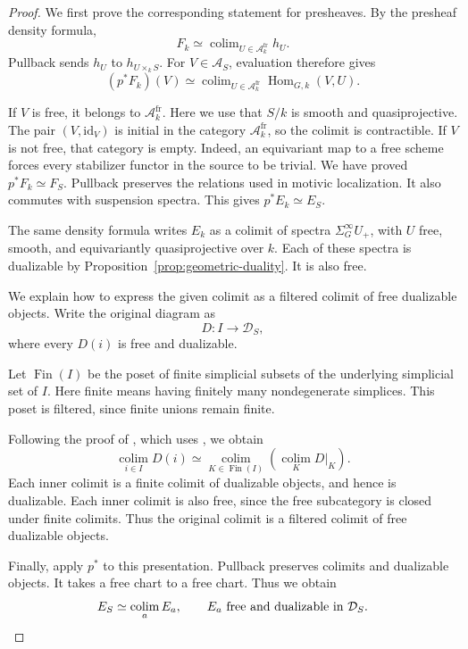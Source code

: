 \documentclass[11pt,reqno]{amsart}
\theoremstyle{definition}
\theoremstyle{remark}
\theoremstyle{plain}
\numberwithin{equation}{section}
\DeclareMathOperator*{\colim}{colim}
\begin{document}
\begin{proof}
We first prove the corresponding statement for presheaves.
By the presheaf density formula,
\[
 F_k\simeq
 \colim_{U\in\mathcal A_k^{\mathrm{fr}}}h_U.
\]
Pullback sends \(h_U\) to \(h_{U\times_k S}\).
For \(V\in\mathcal A_S\), evaluation therefore gives
\[
 (p^*F_k)(V)\simeq
 \colim_{U\in\mathcal A_k^{\mathrm{fr}}}
 \operatorname{Hom}_{G,k}(V,U).
\]

If \(V\) is free, it belongs to \(\mathcal A_k^{\mathrm{fr}}\).
Here we use that \(S/k\) is smooth and quasiprojective.
The pair \((V,\mathrm{id}_V)\) is initial in the category \(\mathcal A_k^{\mathrm{fr}}\),
so the colimit is contractible.
If \(V\) is not free, that category is empty.
Indeed, an equivariant map to a free scheme forces every stabilizer
functor in the source to be trivial.
We have proved \(p^*F_k\simeq F_S\).
Pullback preserves the relations used in motivic localization.
It also commutes with suspension spectra.
This gives \(p^*E_k\simeq E_S\).

The same density formula writes \(E_k\) as a colimit of spectra
\(\Sigma^\infty_G U_+\), with \(U\) free, smooth, and equivariantly
quasiprojective over \(k\).
Each of these spectra is dualizable by Proposition~\ref{prop:geometric-duality}.
It is also free.

We explain how to express the given colimit as a filtered colimit
of free dualizable objects. Write the original diagram as
\[
 D:I\longrightarrow\mathcal D_S,
\]
where every \(D(i)\) is free and dualizable.

Let $\operatorname{Fin}(I)$ be the poset of finite simplicial
subsets of the underlying simplicial set of $I$.
Here finite means having finitely many nondegenerate simplices.
This poset is filtered, since finite unions remain finite.

Following the proof of
\cite[Proposition~9.2.1.1, \href{https://kerodon.net/tag/06DB}
{Tag~06DB}]{Kerodon}, which uses
\cite[Corollary~9.1.6.6, \href{https://kerodon.net/tag/03DJ}
{Tag~03DJ}]{Kerodon}, we obtain
\[
  \operatorname*{colim}_{i\in I} D(i)
  \simeq
  \operatorname*{colim}_{K\in\operatorname{Fin}(I)}
  \left(\operatorname*{colim}_{K} D|_K\right).
\]
Each inner colimit is a finite colimit of dualizable objects,
and hence is dualizable.
Each inner colimit is also free, since the free subcategory is
closed under finite colimits. Thus the original colimit is a
filtered colimit of free dualizable objects.

Finally, apply \(p^*\) to this presentation.
Pullback preserves colimits and dualizable objects.
It takes a free chart to a free chart.
Thus we obtain
\[
 E_S\simeq\colim_a E_a,
 \qquad E_a\text{ free and dualizable in }\mathcal D_S.
 \qedhere
\]
\end{proof}
\end{document}
